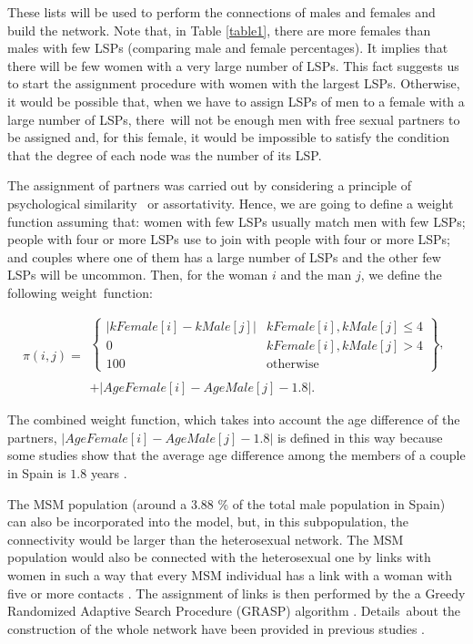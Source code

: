 These lists will be used to perform the connections of males and females and build the network.
Note that, in Table \ref{table1}, there are more females than males with few LSPs (comparing male and female percentages). It implies that there will be few women with a very large number of LSPs. This fact suggests us to start the assignment procedure with women with the largest LSPs. Otherwise, it would be possible that, when we have to assign LSPs of men to a female with a large number of LSPs, there~will not be enough men with free sexual partners to be assigned and, for this female, it would be impossible to satisfy the condition that the degree of each node was the number of its LSP. 

The assignment of partners was carried out by considering a principle of psychological similarity~\cite{PPS} or assortativity.
Hence, we are going to define a weight function assuming that: women with few LSPs usually match men with few LSPs; people with four or more LSPs use to join with people with four or more LSPs; and couples where one of them has a large number of LSPs and the other few LSPs will be uncommon. Then, for the woman $i$ and the man $j$, we define the following weight~function:

\begin{equation}
\pi(i,j) = 
\begin{array}{l}
\left\lbrace \begin{array}{lc}
| kFemale[i] - kMale[j] | & kFemale[i], kMale[j] \le 4 \\
0 & kFemale[i], kMale[j] > 4 \\
100 & \mbox{otherwise}
\end{array} \right\rbrace, \\
\\
 + | AgeFemale[i] - AgeMale[j] - 1.8 |.
\end{array}
\label{peso}
\end{equation}

The combined weight function, which takes into account the age difference of the partners, $\vert AgeFemale[i] - AgeMale[j] - 1.8 \vert$ is defined in this way because some studies show that the average age difference among the members of a couple in Spain is $1.8$ years \cite{Miret}. 

The MSM population (around a $3.88$ \% of the total male population in Spain) can also be incorporated into the model, but, in this subpopulation, the connectivity would be larger than the heterosexual network.
The MSM population would also be connected with the heterosexual one by links with women in such a way that every MSM individual has a link with a woman with five or more contacts \cite{Calibrate}. The assignment of links is then performed by the a Greedy Randomized Adaptive Search Procedure (GRASP) algorithm 
\cite{greedy,FeoResende}. Details~about the construction of the whole network have been provided in previous studies \cite{Calibrate,Network}. 

